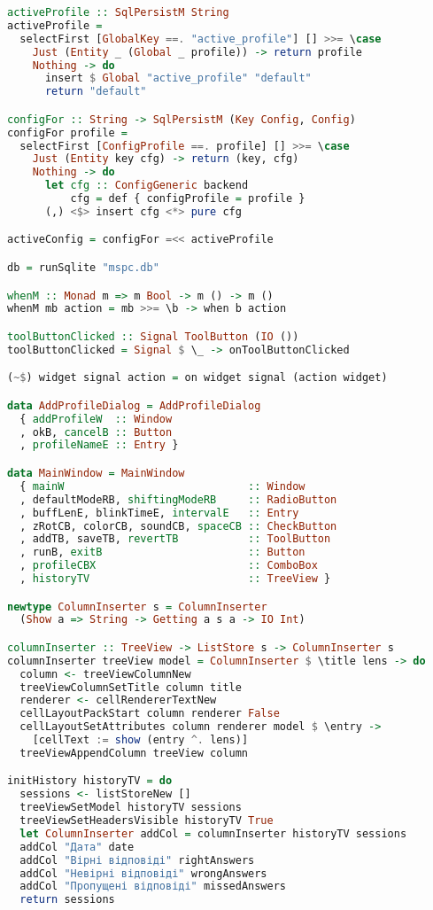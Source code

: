 \begin{lstlisting}[language=Haskell,caption=MemspacerUI.hs]
activeProfile :: SqlPersistM String
activeProfile =
  selectFirst [GlobalKey ==. "active_profile"] [] >>= \case
    Just (Entity _ (Global _ profile)) -> return profile
    Nothing -> do
      insert $ Global "active_profile" "default"
      return "default"

configFor :: String -> SqlPersistM (Key Config, Config)
configFor profile =
  selectFirst [ConfigProfile ==. profile] [] >>= \case
    Just (Entity key cfg) -> return (key, cfg)
    Nothing -> do
      let cfg :: ConfigGeneric backend
          cfg = def { configProfile = profile }
      (,) <$> insert cfg <*> pure cfg

activeConfig = configFor =<< activeProfile

db = runSqlite "mspc.db"

whenM :: Monad m => m Bool -> m () -> m ()
whenM mb action = mb >>= \b -> when b action

toolButtonClicked :: Signal ToolButton (IO ())
toolButtonClicked = Signal $ \_ -> onToolButtonClicked

(~$) widget signal action = on widget signal (action widget)

data AddProfileDialog = AddProfileDialog
  { addProfileW  :: Window
  , okB, cancelB :: Button
  , profileNameE :: Entry }

data MainWindow = MainWindow
  { mainW                             :: Window
  , defaultModeRB, shiftingModeRB     :: RadioButton
  , buffLenE, blinkTimeE, intervalE   :: Entry
  , zRotCB, colorCB, soundCB, spaceCB :: CheckButton
  , addTB, saveTB, revertTB           :: ToolButton
  , runB, exitB                       :: Button
  , profileCBX                        :: ComboBox
  , historyTV                         :: TreeView }

newtype ColumnInserter s = ColumnInserter
  (Show a => String -> Getting a s a -> IO Int)

columnInserter :: TreeView -> ListStore s -> ColumnInserter s
columnInserter treeView model = ColumnInserter $ \title lens -> do
  column <- treeViewColumnNew
  treeViewColumnSetTitle column title
  renderer <- cellRendererTextNew
  cellLayoutPackStart column renderer False
  cellLayoutSetAttributes column renderer model $ \entry ->
    [cellText := show (entry ^. lens)]
  treeViewAppendColumn treeView column

initHistory historyTV = do
  sessions <- listStoreNew []
  treeViewSetModel historyTV sessions
  treeViewSetHeadersVisible historyTV True
  let ColumnInserter addCol = columnInserter historyTV sessions
  addCol "Дата" date
  addCol "Вірні відповіді" rightAnswers
  addCol "Невірні відповіді" wrongAnswers
  addCol "Пропущені відповіді" missedAnswers
  return sessions


\end{lstlisting}
